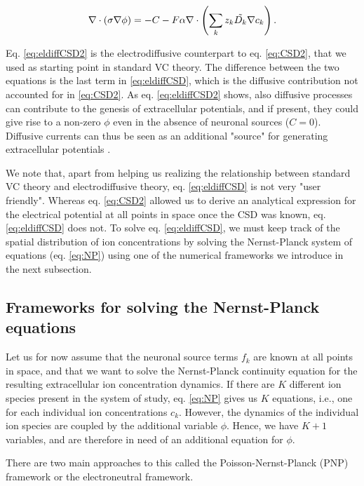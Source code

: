 \begin{equation}
\nabla \cdot (\sigma\nabla\phi) = - C - F\alpha \nabla \cdot \left (\sum_k{z_k \tilde{D_k}{\bf \nabla} c_{k}} \right).
\label{eq:eldiffCSD2}
\end{equation}

Eq. \ref{eq:eldiffCSD2} is the electrodiffusive counterpart to eq. \ref{eq:CSD2}, that we used as starting point in standard VC theory. The difference between the two equations is the last term in \ref{eq:eldiffCSD}, which is the diffusive contribution not accounted for in \ref{eq:CSD2}. As eq. \ref{eq:eldiffCSD2} shows, also diffusive processes can contribute to the genesis of extracellular potentials, and if present, they could give rise to a non-zero $\phi$ even in the absence of neuronal sources ($C = 0$). Diffusive currents can thus be seen as an additional "source" for generating extracellular potentials \cite{Halnes2017}. 

We note that, apart from helping us realizing the relationship between standard VC theory and electrodiffusive theory, eq. \ref{eq:eldiffCSD} is not very "user friendly". Whereas eq. \ref{eq:CSD2} allowed us to derive an analytical expression for the electrical potential at all points in space once the CSD was known, eq. \ref{eq:eldiffCSD} does not. To solve  eq. \ref{eq:eldiffCSD}, we must keep track of the spatial distribution of ion concentrations by solving the Nernst-Planck system of equations (eq. \ref{eq:NP}) using one of the numerical frameworks we introduce in the next subsection.


\subsection{Frameworks for solving the Nernst-Planck equations} 
Let us for now assume that the neuronal source terms $f_k$ are known at all points in space, and that we want to solve the Nernst-Planck continuity equation for the resulting extracellular ion concentration dynamics. If there are $K$ different ion species present in the system of study, eq. \ref{eq:NP} gives us $K$ equations, i.e., one for each individual ion concentrations $c_k$. However, the dynamics of the individual ion species are coupled by the additional variable $\phi$. Hence, we have $K+1$ variables, and are therefore in need of an additional equation for $\phi$. 

There are two main approaches to this called the Poisson-Nernst-Planck (PNP) framework or the electroneutral framework.

